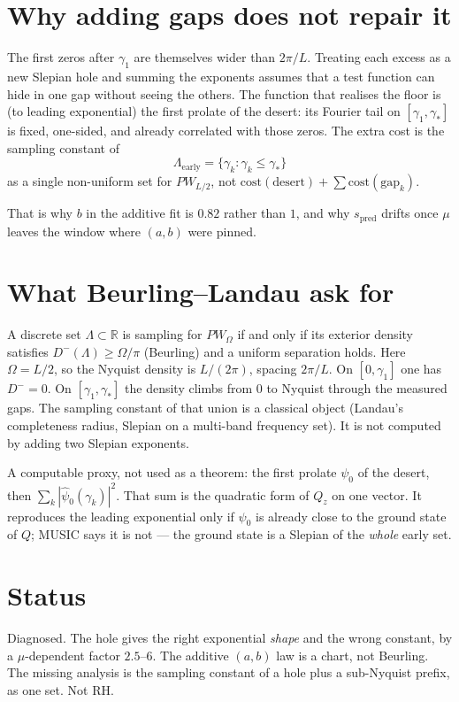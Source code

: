 \documentclass[11pt]{article}
\begin{document}
\section{Why adding gaps does not repair it}
The first zeros after $\gamma_1$ are themselves wider than
$2\pi/L$. Treating each excess as a new Slepian hole and summing
the exponents assumes that a test function can hide in one gap
without seeing the others. The function that realises the floor
is (to leading exponential) the first prolate of the desert: its
Fourier tail on $[\gamma_1,\gamma_*]$ is fixed, one-sided, and
already correlated with those zeros. The extra cost is the
sampling constant of
\[
\Lambda_{\mathrm{early}}=\{\gamma_k:\gamma_k\le\gamma_*\}
\]
as a single non-uniform set for $PW_{L/2}$, not
$\mathrm{cost}(\mathrm{desert})+\sum\mathrm{cost}(\mathrm{gap}_k)$.

That is why $b$ in the additive fit is $0.82$ rather than $1$,
and why $s_{\mathrm{pred}}$ drifts once $\mu$ leaves the window
where $(a,b)$ were pinned.

\section{What Beurling--Landau ask for}
A discrete set $\Lambda\subset\mathbb{R}$ is sampling for
$PW_{\Omega}$ if and only if its exterior density satisfies
$D^-(\Lambda)\ge\Omega/\pi$ (Beurling) and a uniform separation
holds. Here $\Omega=L/2$, so the Nyquist density is $L/(2\pi)$,
spacing $2\pi/L$. On $[0,\gamma_1]$ one has $D^-=0$. On
$[\gamma_1,\gamma_*]$ the density climbs from $0$ to Nyquist
through the measured gaps. The sampling constant of that
union is a classical object (Landau's completeness radius,
Slepian on a multi-band frequency set). It is not computed by
adding two Slepian exponents.

A computable proxy, not used as a theorem: the first prolate
$\psi_0$ of the desert, then $\sum_k|\hat\psi_0(\gamma_k)|^2$.
That sum is the quadratic form of $Q_z$ on one vector. It
reproduces the leading exponential only if $\psi_0$ is already
close to the ground state of $Q$; MUSIC says it is not --- the
ground state is a Slepian of the \emph{whole} early set.

\section*{Status}
Diagnosed. The hole gives the right exponential \emph{shape}
and the wrong constant, by a $\mu$-dependent factor $2.5$--$6$.
The additive $(a,b)$ law is a chart, not Beurling. The missing
analysis is the sampling constant of a hole plus a sub-Nyquist
prefix, as one set. Not RH.
\end{document}

